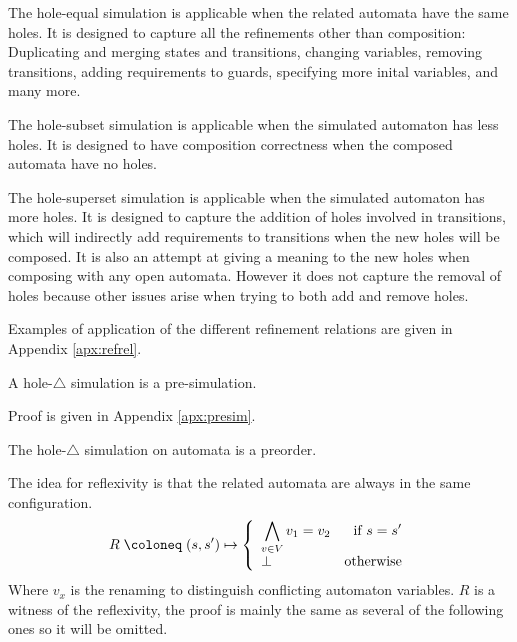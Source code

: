 \documentclass{article}
\begin{document}
The hole-equal simulation is applicable when the related automata have the same holes.
It is designed to capture all the refinements other than composition: Duplicating and merging states and transitions, changing variables, removing transitions, adding requirements to guards, specifying more inital variables, and many more.

The hole-subset simulation is applicable when the simulated automaton has less holes.
It is designed to have composition correctness when the composed automata have no holes.

The hole-superset simulation is applicable when the simulated automaton has more holes.
It is designed to capture the addition of holes involved in transitions, which will indirectly add requirements to transitions when the new holes will be composed.
It is also an attempt at giving a meaning to the new holes when composing with any open automata.
However it does not capture the removal of holes because other issues arise when trying to both add and remove holes.

Examples of application of the different refinement relations are given in Appendix \ref{apx:refrel}.%
\begin{thm} A hole-\(\triangle\) simulation is a pre-simulation. \end{thm}
Proof is given in Appendix \ref{apx:presim}.
\begin{thm} The hole-\(\triangle\) simulation on automata is a preorder. \end{thm}
The idea for reflexivity is that the related automata are always in the same configuration.
\[ R \defobject \mpar{s, s'} \mapsto \choice{\bigwedge_{v \in V} v_1 = v_2 & \text{if } s = s'\\ \bot & \text{otherwise}} \]
Where \(v_x\) is the renaming to distinguish conflicting automaton variables.
\(R\) is a witness of the reflexivity, the proof is mainly the same as several of the following ones so it will be omitted.
\end{document}
